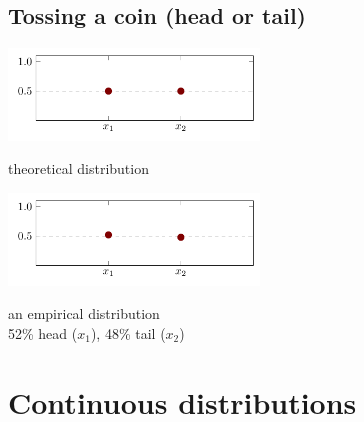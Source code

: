 \documentclass[a4paper]{article}
\begin{document}
	\subsection{Tossing a coin (head or tail)}
		\begin{multicols}{2}
		\centering
		\includegraphics[width=0.5\textwidth]{tail_head_theoretical}
				
		theoretical distribution


		\includegraphics[width=0.5\textwidth]{tail_head_empirical}
		
		an empirical distribution\\52\% head ($x_1$), 48\% tail ($x_2$) 
		\end{multicols}
	
	
	\section{Continuous distributions}
\end{document}
